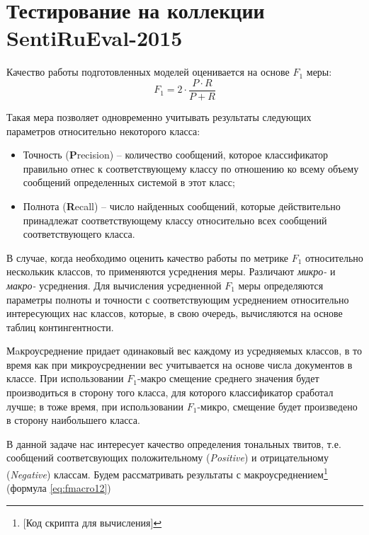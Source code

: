 \section{Тестирование на коллекции SentiRuEval-2015}
\label{sec:sentirueval2015}

Качество работы подготовленных моделей оценивается на основе $F_1$ меры:
\begin{equation}
    \label{eq:fmeasure}
    F_1 = 2 \cdot \dfrac{P \cdot R}{P + R}
\end{equation}

Такая мера позволяет одновременно учитывать результаты следующих параметров
относительно некоторого класса:
\begin{itemize}
    \item Точность ({\bf P}recision) -- количество сообщений, которое
        классификатор правильно отнес к соответствующему классу по отношению ко
        всему объему сообщений определенных системой в этот класс;
    \item Полнота ({\bf R}ecall) -- число найденных сообщений, которые
        действительно принадлежат соответствующему классу относительно всех
        сообщений соответствующего класса.
\end{itemize}

В случае, когда необходимо оценить качество работы по метрике $F_1$ относительно
несколькик классов, то применяются усреднения меры.
Различают {\it микро-} и {\it макро-} усреднения.
Для вычисления усредненной $F_{1}$ меры определяются
параметры полноты и точности с соответствующим усреднением относительно
интересующих нас классов, которые, в свою очередь, вычисляются на основе
таблиц контингентности.

%
%

Мaкроусреднение придает одинаковый вес каждому из усредняемых классов, в то
время как при микроусреднении вес учитывается на основе числа документов в
классе.
При использовании $F_{1}$-макро смещение среднего значения будет производиться в
сторону того класса, для которого классификатор сработал лучше; в тоже время,
при использовании $F_{1}$-микро, смещение будет произведено в сторону наибольшего
класса. \cite{micromacromeasures}

В данной задаче нас интересует качество определения тональных твитов, т.е.
сообщений соответсвующих положительному ({\it Positive}) и отрицательному
({\it Negative}) классам.
Будем рассматривать результаты с макроусреднением\footnote{
    [Код скрипта для вычисления]
} (формула \ref{eq:fmacro12})

